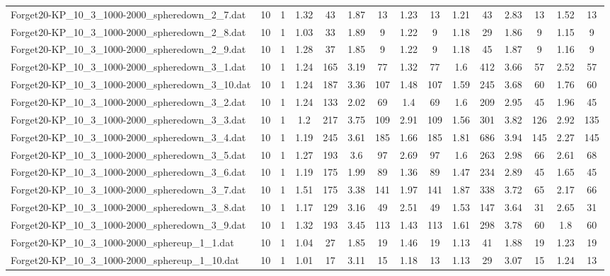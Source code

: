 \begin{table}[!ht]
{\begin{tabular}{lcccccccccccccc}
Forget20-KP\_10\_3\_1000-2000\_spheredown\_2\_7.dat & 10 & 1 & 1.32 & 43 & 1.87 & 13 & 1.23 & 13 & 1.21 & 43 & 2.83 & 13 & 1.52 & 13 \\
Forget20-KP\_10\_3\_1000-2000\_spheredown\_2\_8.dat & 10 & 1 & 1.03 & 33 & 1.89 & 9 & 1.22 & 9 & 1.18 & 29 & 1.86 & 9 & 1.15 & 9 \\
Forget20-KP\_10\_3\_1000-2000\_spheredown\_2\_9.dat & 10 & 1 & 1.28 & 37 & 1.85 & 9 & 1.22 & 9 & 1.18 & 45 & 1.87 & 9 & 1.16 & 9 \\
Forget20-KP\_10\_3\_1000-2000\_spheredown\_3\_1.dat & 10 & 1 & 1.24 & 165 & 3.19 & 77 & 1.32 & 77 & 1.6 & 412 & 3.66 & 57 & 2.52 & 57 \\
Forget20-KP\_10\_3\_1000-2000\_spheredown\_3\_10.dat & 10 & 1 & 1.24 & 187 & 3.36 & 107 & 1.48 & 107 & 1.59 & 245 & 3.68 & 60 & 1.76 & 60 \\
Forget20-KP\_10\_3\_1000-2000\_spheredown\_3\_2.dat & 10 & 1 & 1.24 & 133 & 2.02 & 69 & 1.4 & 69 & 1.6 & 209 & 2.95 & 45 & 1.96 & 45 \\
Forget20-KP\_10\_3\_1000-2000\_spheredown\_3\_3.dat & 10 & 1 & 1.2 & 217 & 3.75 & 109 & 2.91 & 109 & 1.56 & 301 & 3.82 & 126 & 2.92 & 135 \\
Forget20-KP\_10\_3\_1000-2000\_spheredown\_3\_4.dat & 10 & 1 & 1.19 & 245 & 3.61 & 185 & 1.66 & 185 & 1.81 & 686 & 3.94 & 145 & 2.27 & 145 \\
Forget20-KP\_10\_3\_1000-2000\_spheredown\_3\_5.dat & 10 & 1 & 1.27 & 193 & 3.6 & 97 & 2.69 & 97 & 1.6 & 263 & 2.98 & 66 & 2.61 & 68 \\
Forget20-KP\_10\_3\_1000-2000\_spheredown\_3\_6.dat & 10 & 1 & 1.19 & 175 & 1.99 & 89 & 1.36 & 89 & 1.47 & 234 & 2.89 & 45 & 1.65 & 45 \\
Forget20-KP\_10\_3\_1000-2000\_spheredown\_3\_7.dat & 10 & 1 & 1.51 & 175 & 3.38 & 141 & 1.97 & 141 & 1.87 & 338 & 3.72 & 65 & 2.17 & 66 \\
Forget20-KP\_10\_3\_1000-2000\_spheredown\_3\_8.dat & 10 & 1 & 1.17 & 129 & 3.16 & 49 & 2.51 & 49 & 1.53 & 147 & 3.64 & 31 & 2.65 & 31 \\
Forget20-KP\_10\_3\_1000-2000\_spheredown\_3\_9.dat & 10 & 1 & 1.32 & 193 & 3.45 & 113 & 1.43 & 113 & 1.61 & 298 & 3.78 & 60 & 1.8 & 60 \\
Forget20-KP\_10\_3\_1000-2000\_sphereup\_1\_1.dat & 10 & 1 & 1.04 & 27 & 1.85 & 19 & 1.46 & 19 & 1.13 & 41 & 1.88 & 19 & 1.23 & 19 \\
Forget20-KP\_10\_3\_1000-2000\_sphereup\_1\_10.dat & 10 & 1 & 1.01 & 17 & 3.11 & 15 & 1.18 & 13 & 1.13 & 29 & 3.07 & 15 & 1.24 & 13 \\

\end{tabular}}
\end{table}
